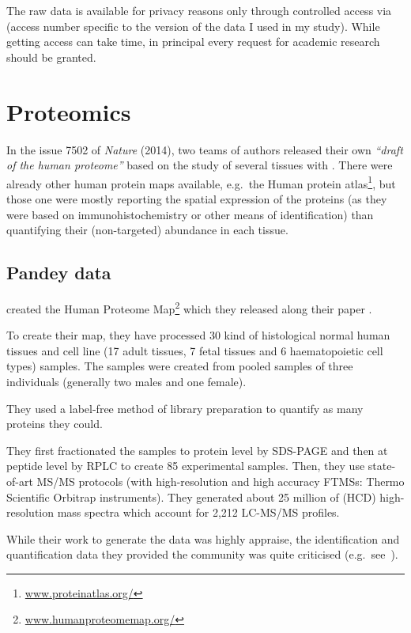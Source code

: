 The raw data is available for privacy reasons only through controlled access via
 (access number specific to the version of the data I used
in my study). While getting access can take time, in principal every request for
academic research should be granted.


\section{Proteomics}

In the issue 7502 of \textit{Nature} (2014), two teams of authors released their
own \emph{``draft of the human proteome''} based on the study of several tissues
with \ms. There were already other human protein maps available,
e.g.\ the Human protein atlas\footnote{%
\href{http://www.humanproteomemap.org/}{www.proteinatlas.org/}}, but those one
were mostly reporting the spatial expression of the proteins (as they were based
on immunohistochemistry or other means of identification) than
quantifying their (non-targeted) abundance in each tissue.


\subsection{Pandey data}

\cite{PandeyData} created the Human Proteome Map\footnote{%
\href{http://www.humanproteomemap.org/}{\small www.humanproteomemap.org/}} which
they released along their paper .

To create their map, they have processed 30 kind of histological normal human
tissues and cell line (17 adult tissues, 7 fetal tissues and 6 haematopoietic
cell types) samples. The samples were created from pooled samples of three
individuals (generally two males and one female).

They used a label-free method of library preparation to quantify as many proteins
they could.

They first fractionated the samples to protein level by
\gls{SDS-PAGE} and then at peptide level by \gls{RPLC} to create 85 experimental
samples. Then, they use
state-of-art \gls{MS/MS} protocols (with high-resolution and high accuracy
\glspl{FTMS}: Thermo Scientific Orbitrap instruments).
They generated about 25 million of (\gls{HCD})
high-resolution mass spectra which account for 2,212 \gls{LC-MS/MS} profiles.

While their work to generate the data was highly appraise, the identification and
quantification data they provided the community was quite criticised
(e.g.\ see~\cite{Ezkurdia2014-qx}).


